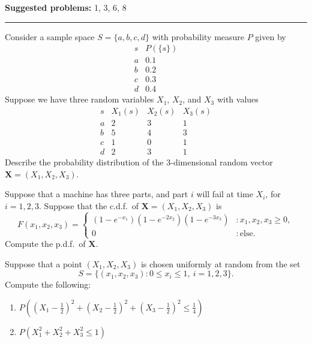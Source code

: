 \documentclass[12pt,reqno]{amsart}
\begin{document}
\textbf{Suggested problems:} 1, 3, 6, 8

\bigskip
\hrule

\bigskip
\prob Consider a sample space $S=\{a,b,c,d\}$ with probability measure $P$ given by
\[
\begin{array}{c|c}
	s & P(\{s\}) \\ \hline
	a & 0.1 \\
	b & 0.2 \\
	c & 0.3 \\
	d & 0.4 
\end{array}
\]
Suppose we have three random variables $X_1$, $X_2$, and $X_3$ with values
\[
\begin{array}{c|ccc}
	s & X_1(s) & X_2(s) & X_3(s) \\ \hline
	a & 2 & 3 & 1 \\
	b & 5 & 4 & 3 \\
	c & 1 & 0 & 1 \\
	d & 2 & 3 & 1
\end{array}
\]
Describe the probability distribution of the $3$-dimensional random vector $\mathbf{X} = (X_1,X_2,X_3)$.

\vfill
\prob Suppose that a machine has three parts, and part $i$ will fail at time $X_i$, for $i=1,2,3$. Suppose that the c.d.f.\ of $\mathbf{X} = (X_1,X_2,X_3)$ is
\[
	F(x_1,x_2,x_3) = \begin{cases}
	(1-e^{-x_1})(1-e^{-2x_2})(1-e^{-3x_3}) & : x_1,x_2,x_3 \geq 0, \\
	0 & : \text{else}.
	\end{cases}
\]
Compute the p.d.f.\ of $\mathbf{X}$.

\vfill
\newpage
\prob Suppose that a point $(X_1,X_2,X_3)$ is chosen uniformly at random from the set
\[
	S = \{(x_1,x_2,x_3) : 0 \leq x_i \leq 1, \ i=1,2,3\}.
\]
Compute the following:
\begin{enumerate}
\item $P \left( \left(X_1 - \frac{1}{2}\right)^2 + \left(X_2 - \frac{1}{2}\right)^2 + \left(X_3 - \frac{1}{2}\right)^2 \leq \frac{1}{4} \right)$\vspace{2.5in}
\item $P \left( X_1^2 + X_2^2 + X_3^2 \leq 1\right)$\vspace{2.5in}
\end{enumerate}
\end{document}
